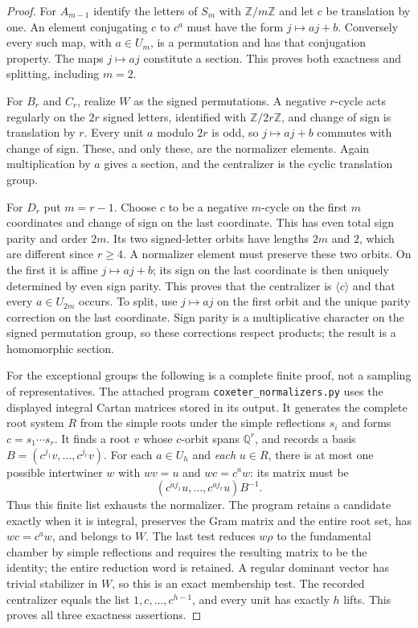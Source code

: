 \begin{proof}
For $A_{m-1}$ identify the letters of $S_m$ with $\mathbb Z/m\mathbb Z$
and let $c$ be translation by one.  An element conjugating $c$ to $c^a$
must have the form $j\mapsto aj+b$.  Conversely every such map, with
$a\in U_m$, is a permutation and has that conjugation property.  The
maps $j\mapsto aj$ constitute a section.  This proves both exactness and
splitting, including $m=2$.

For $B_r$ and $C_r$, realize $W$ as the signed permutations.  A negative
$r$-cycle acts regularly on the $2r$ signed letters, identified with
$\mathbb Z/2r\mathbb Z$, and change of sign is translation by $r$.
Every unit $a$ modulo $2r$ is odd, so $j\mapsto aj+b$ commutes with
change of sign.  These, and only these, are the normalizer elements.
Again multiplication by $a$ gives a section, and the centralizer is
the cyclic translation group.

For $D_r$ put $m=r-1$.  Choose $c$ to be a negative $m$-cycle on the
first $m$ coordinates and change of sign on the last coordinate.  This
has even total sign parity and order $2m$.  Its two signed-letter orbits
have lengths $2m$ and $2$, which are different since $r\ge4$.  A
normalizer element must preserve these two orbits.  On the first it is
affine $j\mapsto aj+b$; its sign on the last coordinate is then uniquely
determined by even sign parity.  This proves that the centralizer is
$\langle c\rangle$ and that every $a\in U_{2m}$ occurs.  To split, use
$j\mapsto aj$ on the first orbit and the unique parity correction on the
last coordinate.  Sign parity is a multiplicative character on the
signed permutation group, so these corrections respect products; the
result is a homomorphic section.

For the exceptional groups the following is a complete finite proof,
not a sampling of representatives.  The attached program
\texttt{coxeter\_normalizers.py} uses the displayed integral Cartan
matrices stored in its output.  It generates the complete root system
$R$ from the simple roots under the simple reflections $s_i$ and forms
$c=s_1\cdots s_r$.  It finds a root $v$ whose $c$-orbit spans
$\mathbb Q^r$, and records a basis
$B=(c^{j_1}v,\ldots,c^{j_r}v)$.  For each $a\in U_h$ and \emph{each}
$u\in R$, there is at most one possible intertwiner $w$ with
$wv=u$ and $wc=c^aw$: its matrix must be
\[
 (c^{aj_1}u,\ldots,c^{aj_r}u)B^{-1}.
\]
Thus this finite list exhausts the normalizer.  The program retains a
candidate exactly when it is integral, preserves the Gram matrix and
the entire root set, has $wc=c^aw$, and belongs to $W$.  The last test
reduces $w\rho$ to the fundamental chamber by simple reflections and
requires the resulting matrix to be the identity; the entire reduction
word is retained.  A regular dominant vector has trivial stabilizer in
$W$, so this is an exact membership test.  The recorded centralizer
equals the list $1,c,\ldots,c^{h-1}$, and every unit has exactly $h$
lifts.  This proves all three exactness assertions.


\end{proof}
